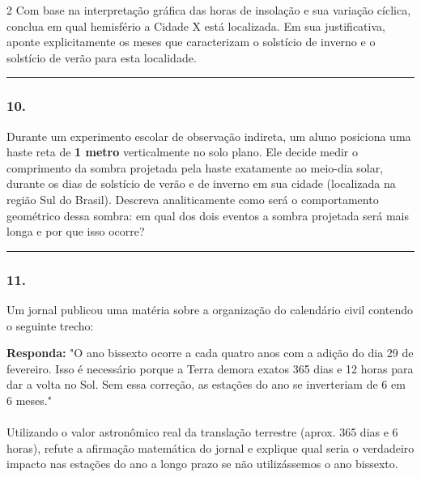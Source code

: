 \documentclass[twoside, 10pt, a4paper]{article}
\newlength{\espacoPreQuestao}\setlength{\espacoPreQuestao}{0.1cm}
\newlength{\espacoQuestao}\setlength{\espacoQuestao}{0.2cm}
\begin{document}
\begin{multicols*}{2}
Com base na interpretação gráfica das horas de insolação e sua variação cíclica, conclua em qual hemisfério a Cidade X está localizada. Em sua justificativa, aponte explicitamente os meses que caracterizam o solstício de inverno e o solstício de verão para esta localidade.
\par\vspace{\espacoQuestao}

\noindent\textcolor{CorLinha}{\rule{\linewidth}{0.5pt}} 
\par\vspace{\espacoPreQuestao}
\subsubsection*{10.} Durante um experimento escolar de observação indireta, um aluno posiciona uma haste reta de \textbf{1 metro} verticalmente no solo plano. Ele decide medir o comprimento da sombra projetada pela haste exatamente ao meio-dia solar, durante os dias de solstício de verão e de inverno em sua cidade (localizada na região Sul do Brasil). Descreva analiticamente como será o comportamento geométrico dessa sombra: em qual dos dois eventos a sombra projetada será mais longa e por que isso ocorre?
\par\vspace{\espacoQuestao}

\noindent\textcolor{CorLinha}{\rule{\linewidth}{0.5pt}} 
\par\vspace{\espacoPreQuestao}
\subsubsection*{11.} Um jornal publicou uma matéria sobre a organização do calendário civil contendo o seguinte trecho:

\begin{boxresponda}
\textbf{Responda:} "O ano bissexto ocorre a cada quatro anos com a adição do dia 29 de fevereiro. Isso é necessário porque a Terra demora exatos 365 dias e 12 horas para dar a volta no Sol. Sem essa correção, as estações do ano se inverteriam de 6 em 6 meses."\\
\\
Utilizando o valor astronômico real da translação terrestre (aprox. 365 dias e 6 horas), refute a afirmação matemática do jornal e explique qual seria o verdadeiro impacto nas estações do ano a longo prazo se não utilizássemos o ano bissexto.
\end{boxresponda}
\par\vspace{\espacoQuestao}


\end{multicols*}
\end{document}
